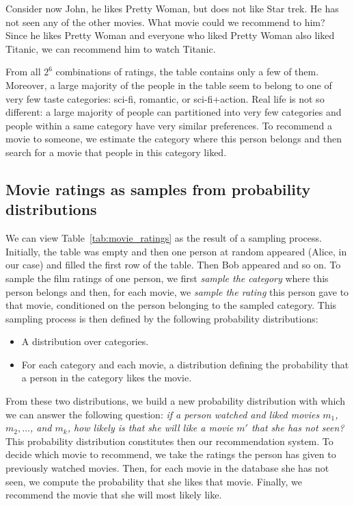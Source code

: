 Consider now John, he likes Pretty Woman, but does not like Star trek. He has not seen any of the other movies. What movie could we recommend to him? Since he likes Pretty Woman and everyone who liked Pretty Woman also liked Titanic, we can recommend him to watch Titanic.

From all $2^6$ combinations of ratings, the table contains only a few of them. Moreover, a large majority of the people in the table seem to belong to one of very few taste categories: sci-fi, romantic, or sci-fi+action. Real life is not so different: a large majority of people can partitioned into very few categories and people within a same category have very similar preferences. To recommend a movie to someone, we estimate the category where this person belongs and then search for a movie that people in this category liked.

\subsection{Movie ratings as samples from probability distributions}
\label{sub:ratings_as_samples}

We can view Table~\ref{tab:movie_ratings} as the result of a sampling process. Initially, the table was empty and then one person at random appeared (Alice, in our case) and filled the first row of the table. Then Bob appeared and so on. To sample the film ratings of one person, we first \emph{sample the category} where this person belongs and then, for each movie, we \emph{sample the rating} this person gave to that movie, conditioned on the person belonging to the sampled category. This sampling process is then defined by the following probability distributions:

\begin{itemize}
\item A distribution over categories.
\item For each category and each movie, a distribution defining the probability that a person in the category likes the movie.
\end{itemize}

From these two distributions, we build a new probability distribution with which we can answer the following question: \emph{if a person watched and liked movies $m_1$, $m_2, \ldots$, and $m_k$, how likely is that she will like a movie $m'$ that she has not seen?} This probability distribution constitutes then our recommendation system. To decide which movie to recommend, we take the ratings the person has given to previously watched movies. Then, for each movie in the database she has not seen, we compute the probability that she likes that movie. Finally, we recommend the movie that she will most likely like.

